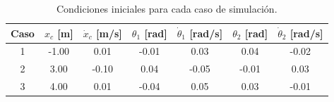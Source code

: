 \begin{table}[H]
\centering
\caption{Condiciones iniciales para cada caso de simulación.}
\label{tab:casos}
\begin{tabular}{ccccccc}
\toprule
Caso & $x_c$ [m] & $\dot{x}_c$ [m/s] & $\theta_1$ [rad] & $\dot{\theta}_1$ [rad/s] & $\theta_2$ [rad] & $\dot{\theta}_2$ [rad/s] \\
\midrule
1 & -1.00 & 0.01 & -0.01 & 0.03 & 0.04 & -0.02 \\
2 & 3.00 & -0.10 & 0.04 & -0.05 & -0.01 & 0.03 \\
3 & 4.00 & 0.01 & -0.04 & 0.05 & 0.03 & -0.01 \\
\bottomrule
\end{tabular}
\end{table}
